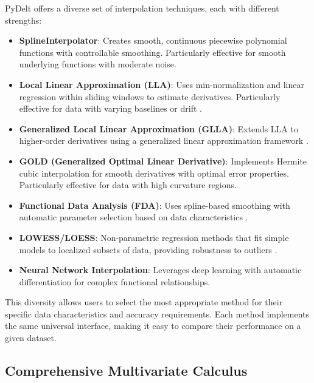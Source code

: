 \documentclass[11pt,a4paper]{article}
\begin{document}
PyDelt offers a diverse set of interpolation techniques, each with different strengths:

\begin{itemize}
    \item \textbf{SplineInterpolator}: Creates smooth, continuous piecewise polynomial functions with controllable smoothing. Particularly effective for smooth underlying functions with moderate noise.
    
    \item \textbf{Local Linear Approximation (LLA)}: Uses min-normalization and linear regression within sliding windows to estimate derivatives. Particularly effective for data with varying baselines or drift \citep{boker2002method}.
    
    \item \textbf{Generalized Local Linear Approximation (GLLA)}: Extends LLA to higher-order derivatives using a generalized linear approximation framework \citep{boker2010generalized}.
    
    \item \textbf{GOLD (Generalized Optimal Linear Derivative)}: Implements Hermite cubic interpolation for smooth derivatives with optimal error properties. Particularly effective for data with high curvature regions.
    
    \item \textbf{Functional Data Analysis (FDA)}: Uses spline-based smoothing with automatic parameter selection based on data characteristics \citep{ramsay2005functional}.
    
    \item \textbf{LOWESS/LOESS}: Non-parametric regression methods that fit simple models to localized subsets of data, providing robustness to outliers \citep{cleveland1979robust}.
    
    \item \textbf{Neural Network Interpolation}: Leverages deep learning with automatic differentiation for complex functional relationships.
\end{itemize}

This diversity allows users to select the most appropriate method for their specific data characteristics and accuracy requirements. Each method implements the same universal interface, making it easy to compare their performance on a given dataset.

\subsection{Comprehensive Multivariate Calculus}
\end{document}
